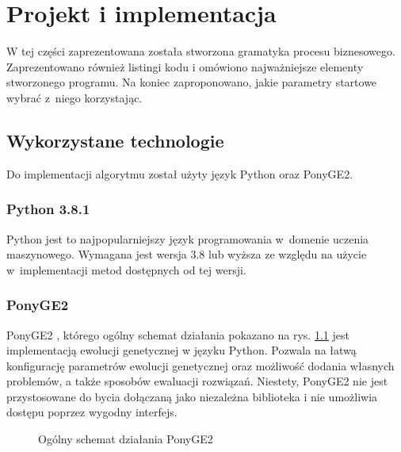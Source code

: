 \chapter{Projekt i implementacja}

W tej części zaprezentowana została stworzona gramatyka procesu biznesowego. Zaprezentowano również listingi kodu i omówiono najważniejsze elementy stworzonego programu. Na koniec zaproponowano, jakie parametry startowe wybrać z~niego korzystając.

\section{Wykorzystane technologie}
Do implementacji algorytmu został użyty język Python oraz PonyGE2. 

\subsection{Python 3.8.1}
Python jest to najpopularniejszy język programowania w~domenie uczenia maszynowego. Wymagana jest wersja 3.8 lub wyższa ze względu na użycie w~implementacji metod dostępnych od tej wersji.  

\subsection{PonyGE2}
PonyGE2 \cite{Fenton_2017}, którego ogólny schemat działania pokazano na rys. \ref{fig:PonyGE2-search-loop} jest implementacją ewolucji genetycznej w języku Python. Pozwala na łatwą konfigurację parametrów ewolucji genetycznej oraz możliwość dodania własnych problemów, a także sposobów ewaluacji rozwiązań. Niestety, PonyGE2 nie jest przystosowane do bycia dołączaną jako niezależna biblioteka i nie umożliwia dostępu poprzez wygodny interfejs. 

\begin{figure}[h]
	\caption{\label{fig:PonyGE2-search-loop}Ogólny schemat działania PonyGE2 \cite{Fenton_2017}}
\end{figure}

